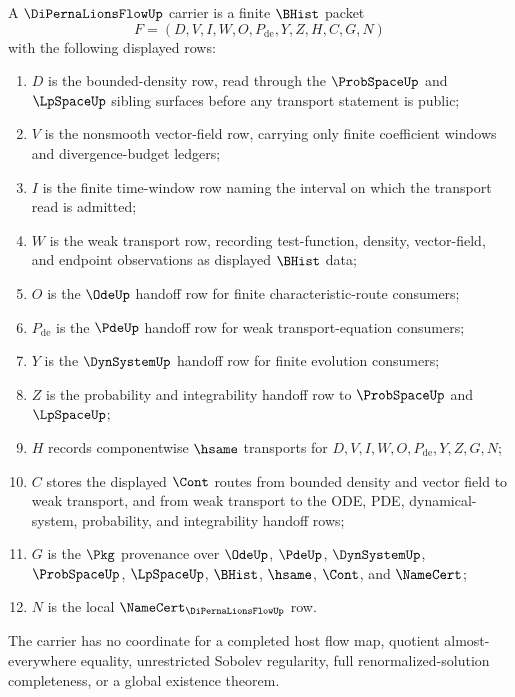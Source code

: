 \begin{definition}
\label{def:di-perna-lions-flow-carrier}
A $\DiPernaLionsFlowUp$ carrier is a finite $\BHist$ packet
$$
F=(D,V,I,W,O,P_{\mathrm{de}},Y,Z,H,C,G,N)
$$
with the following displayed rows:
\begin{enumerate}
\item $D$ is the bounded-density row, read through the $\ProbSpaceUp$ and $\LpSpaceUp$ sibling surfaces before any transport statement is public;
\item $V$ is the nonsmooth vector-field row, carrying only finite coefficient windows and divergence-budget ledgers;
\item $I$ is the finite time-window row naming the interval on which the transport read is admitted;
\item $W$ is the weak transport row, recording test-function, density, vector-field, and endpoint observations as displayed $\BHist$ data;
\item $O$ is the $\OdeUp$ handoff row for finite characteristic-route consumers;
\item $P_{\mathrm{de}}$ is the $\PdeUp$ handoff row for weak transport-equation consumers;
\item $Y$ is the $\DynSystemUp$ handoff row for finite evolution consumers;
\item $Z$ is the probability and integrability handoff row to $\ProbSpaceUp$ and $\LpSpaceUp$;
\item $H$ records componentwise $\hsame$ transports for $D,V,I,W,O,P_{\mathrm{de}},Y,Z,G,N$;
\item $C$ stores the displayed $\Cont$ routes from bounded density and vector field to weak transport, and from weak transport to the ODE, PDE, dynamical-system, probability, and integrability handoff rows;
\item $G$ is the $\Pkg$ provenance over $\OdeUp$, $\PdeUp$, $\DynSystemUp$, $\ProbSpaceUp$, $\LpSpaceUp$, $\BHist$, $\hsame$, $\Cont$, and $\NameCert$;
\item $N$ is the local $\NameCert_{\DiPernaLionsFlowUp}$ row.
\end{enumerate}
The carrier has no coordinate for a completed host flow map, quotient almost-everywhere equality, unrestricted Sobolev regularity, full renormalized-solution completeness, or a global existence theorem.
\end{definition}

